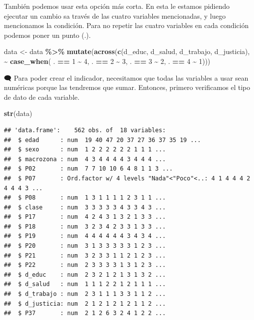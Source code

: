 \documentclass[
]{article}
\newenvironment{Shaded}{\begin{snugshade}}{\end{snugshade}}
\newcommand{\DecValTok}[1]{\textcolor[rgb]{0.00,0.00,0.81}{#1}}
\newcommand{\FunctionTok}[1]{\textcolor[rgb]{0.13,0.29,0.53}{\textbf{#1}}}
\newcommand{\NormalTok}[1]{#1}
\newcommand{\OtherTok}[1]{\textcolor[rgb]{0.56,0.35,0.01}{#1}}
\newcommand{\SpecialCharTok}[1]{\textcolor[rgb]{0.81,0.36,0.00}{\textbf{#1}}}
\begin{document}
También podemos usar esta opción más corta. En esta le estamos pidiendo
ejecutar un cambio sa través de las cuatro variables mencionadas, y
luego mencionamos la condición. Para no repetir las cuatro variables en
cada condición podemos poner un punto (.).

\begin{Shaded}
\begin{Highlighting}[]
\NormalTok{data }\OtherTok{\textless{}{-}}\NormalTok{ data }\SpecialCharTok{\%\textgreater{}\%}
  \FunctionTok{mutate}\NormalTok{(}\FunctionTok{across}\NormalTok{(}\FunctionTok{c}\NormalTok{(d\_educ, d\_salud, d\_trabajo, d\_justicia),}
    \SpecialCharTok{\textasciitilde{}} \FunctionTok{case\_when}\NormalTok{(}
\NormalTok{        . }\SpecialCharTok{==} \DecValTok{1} \SpecialCharTok{\textasciitilde{}} \DecValTok{4}\NormalTok{,}
\NormalTok{        . }\SpecialCharTok{==} \DecValTok{2} \SpecialCharTok{\textasciitilde{}} \DecValTok{3}\NormalTok{,}
\NormalTok{        . }\SpecialCharTok{==} \DecValTok{3} \SpecialCharTok{\textasciitilde{}} \DecValTok{2}\NormalTok{,}
\NormalTok{        . }\SpecialCharTok{==} \DecValTok{4} \SpecialCharTok{\textasciitilde{}} \DecValTok{1}\NormalTok{)))}
\end{Highlighting}
\end{Shaded}

🗨️ Para poder crear el indicador, necesitamos que todas las variables a
usar sean numéricas porque las tendremos que sumar. Entonces, primero
verificamos el tipo de dato de cada variable.

\begin{Shaded}
\begin{Highlighting}[]
\FunctionTok{str}\NormalTok{(data)}
\end{Highlighting}
\end{Shaded}

\begin{verbatim}
## 'data.frame':    562 obs. of  18 variables:
##  $ edad      : num  19 40 47 20 37 27 36 37 35 19 ...
##  $ sexo      : num  1 2 2 2 2 2 2 1 1 1 ...
##  $ macrozona : num  4 3 4 4 4 4 3 4 4 4 ...
##  $ P02       : num  7 7 10 10 6 4 8 1 1 3 ...
##  $ P07       : Ord.factor w/ 4 levels "Nada"<"Poco"<..: 4 1 4 4 4 2 4 4 4 3 ...
##  $ P08       : num  1 3 1 1 1 1 2 3 1 1 ...
##  $ clase     : num  3 3 3 3 3 4 3 3 4 3 ...
##  $ P17       : num  4 2 4 3 1 3 2 1 3 3 ...
##  $ P18       : num  3 2 3 4 2 3 3 1 3 3 ...
##  $ P19       : num  4 4 4 4 4 4 3 4 3 4 ...
##  $ P20       : num  3 1 3 3 3 3 3 1 2 3 ...
##  $ P21       : num  3 2 3 3 1 1 2 1 2 3 ...
##  $ P22       : num  2 3 3 3 3 1 3 1 2 3 ...
##  $ d_educ    : num  2 3 2 1 2 1 3 1 3 2 ...
##  $ d_salud   : num  1 1 1 2 2 1 2 1 1 1 ...
##  $ d_trabajo : num  2 3 1 1 1 3 3 1 1 2 ...
##  $ d_justicia: num  2 1 2 1 2 1 2 1 1 2 ...
##  $ P37       : num  2 1 2 6 3 2 4 1 2 2 ...
\end{verbatim}
\end{document}
